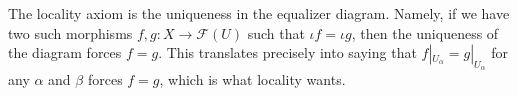The locality axiom is the uniqueness in the equalizer diagram. Namely, if we have two such morphisms $f,g:X\to\mathcal F(U)$ such that $\iota f=\iota g$, then the uniqueness of the diagram forces $f=g$. This translates precisely into saying that $f|_{U_\alpha}=g|_{U_\alpha}$ for any $\alpha$ and $\beta$ forces $f=g$, which is what locality wants.